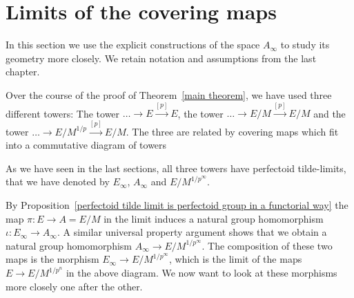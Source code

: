 \documentclass[10pt,oneside]{amsart}
\theoremstyle{definition}
\begin{document}
	
	\section{Limits of the covering maps}
	In this section we use the explicit constructions of the space $A_\infty$ to study its geometry more closely. We retain notation and assumptions from the last chapter.
	
	Over the course of the proof of Theorem~\ref{main theorem}, we have used three different towers: The tower $\dots \rightarrow E\xrightarrow{[p]} E$, the tower $\dots \rightarrow E/M \xrightarrow{[p]} E/M$ and the tower $\dots \rightarrow E/M^{1/p} \xrightarrow{[p]} E/M$. The three are related by covering maps which fit into a commutative diagram of towers
	\begin{center}
	\end{center}
	As we have seen in the last sections, all three towers have perfectoid tilde-limits, that we have denoted by $E_\infty$, $A_\infty$ and $E/M^{1/p^\infty}$.
	
	By Proposition~\ref{perfectoid tilde limit is perfectoid group in a functorial way} the map $\pi:E\rightarrow A=E/M$ in the limit induces a natural group homomorphism $\iota:E_\infty \rightarrow A_\infty$. A similar universal property argument shows that we obtain a natural group homomorphism $A_\infty \rightarrow E/M^{1/p^\infty}$. The composition of these two maps is the morphism $E_\infty\rightarrow E/M^{1/p^\infty}$, which is the limit of the maps $E\rightarrow E/M^{1/p^n}$ in the above diagram.
	We now want to look at these morphisms more closely one after the other.
	
\end{document}
